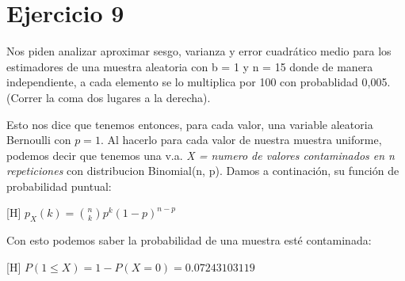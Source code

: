 \section{Ejercicio 9}

Nos piden analizar aproximar sesgo, varianza y error cuadrático medio para los estimadores de una muestra aleatoria con b = 1 y n = 15 donde de manera independiente, a cada elemento se lo multiplica por 100 con probablidad 0,005. (Correr la coma dos lugares a la derecha).

Esto nos dice que tenemos entonces, para cada valor, una variable aleatoria Bernoulli con $p = 1$. Al hacerlo para cada valor de nuestra muestra uniforme, podemos decir que tenemos una v.a. \textit{X = numero de valores contaminados en n repeticiones} con distribucion Binomial(n, p). Damos a continaci\'on, su funci\'on de probabilidad puntual:

\begin{center}[H]
	$p_X(k) = \binom{n}{k}p^k(1-p)^{n-p}$
\end{center}

Con esto podemos saber la probabilidad de una muestra est\'e contaminada:

\begin{center}[H]
	$P(1 \leqslant X) = 1 - P(X = 0) = 0.07243103119$
\end{center}


